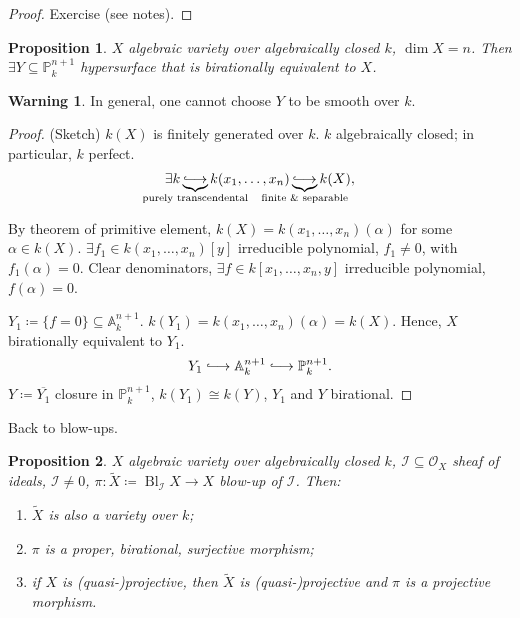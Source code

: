 \documentclass[12pt]{article}
\DeclareMathOperator{\Bl}{Bl}
\newtheorem*{proposition}{Proposition}
\theoremstyle{definition}
\newtheorem*{warning}{Warning}
\theoremstyle{remark}
\begin{document}
\begin{proof}
Exercise (see notes).
\end{proof}

\begin{proposition}
$X$ algebraic variety over algebraically closed $k$, $\dim X=n$. Then $\exists Y\subseteq\mathbb{P}_k^{n+1}$ hypersurface that is birationally equivalent to $X$.
\end{proposition}

\begin{warning}
In general, one cannot choose $Y$ to be smooth over $k$.
\end{warning}

\begin{proof}
(Sketch) $k(X)$ is finitely generated over $k$. $k$ algebraically closed; in particular, $k$ perfect.
\[\exists k\underbrace{\lhook\joinrel\longrightarrow}_{\mathclap{\text{purely transcendental}}}k(x_1,\ldots,x_n)\underbrace{\lhook\joinrel\longrightarrow}_{\mathclap{\text{finite \& separable}}}k(X),\]

By theorem of primitive element, $k(X)=k(x_1,\ldots,x_n)(\alpha)$ for some $\alpha\in k(X)$. $\exists f_1\in k(x_1,\ldots,x_n)[y]$ irreducible polynomial, $f_1\neq0$, with $f_1(\alpha)=0$. Clear denominators, $\exists f\in k[x_1,\ldots,x_n,y]$ irreducible polynomial, $f(\alpha)=0$.

$Y_1\coloneqq\{f=0\}\subseteq\mathbb{A}_k^{n+1}$. $k(Y_1)=k(x_1,\ldots,x_n)(\alpha)=k(X)$. Hence, $X$ birationally equivalent to $Y_1$.
\[Y_1\lhook\joinrel\longrightarrow\mathbb{A}_k^{n+1}\lhook\joinrel\longrightarrow\mathbb{P}_k^{n+1}.\]
$Y\coloneqq\overline{Y_1}$ closure in $\mathbb{P}_k^{n+1}$, $k(Y_1)\cong k(Y)$, $Y_1$ and $Y$ birational.
\end{proof}

Back to blow-ups.

\begin{proposition}
$X$ algebraic variety over algebraically closed $k$, $\mathcal{I}\subseteq\mathcal{O}_X$ sheaf of ideals, $\mathcal{I}\neq0$, $\pi:\widetilde{X}\coloneqq\Bl_{\mathcal{I}}X\rightarrow X$ blow-up of $\mathcal{I}$. Then:
\begin{enumerate}[label=\arabic*)]
\item $\widetilde{X}$ is also a variety over $k$;
\item $\pi$ is a proper, birational, surjective morphism;
\item if $X$ is (quasi-)projective, then $\widetilde{X}$ is (quasi-)projective and $\pi$ is a projective morphism.
\end{enumerate}
\end{proposition}
\end{document}
